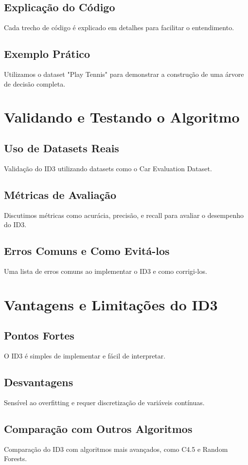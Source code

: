 \documentclass{article}
\begin{document}
\subsection{Explicação do Código}
Cada trecho de código é explicado em detalhes para facilitar o entendimento.

\subsection{Exemplo Prático}
Utilizamos o dataset "Play Tennis" para demonstrar a construção de uma árvore de decisão completa.

\section{Validando e Testando o Algoritmo}
\subsection{Uso de Datasets Reais}
Validação do ID3 utilizando datasets como o Car Evaluation Dataset.

\subsection{Métricas de Avaliação}
Discutimos métricas como acurácia, precisão, e recall para avaliar o desempenho do ID3.

\subsection{Erros Comuns e Como Evitá-los}
Uma lista de erros comuns ao implementar o ID3 e como corrigi-los.

\section{Vantagens e Limitações do ID3}
\subsection{Pontos Fortes}
O ID3 é simples de implementar e fácil de interpretar.

\subsection{Desvantagens}
Sensível ao overfitting e requer discretização de variáveis contínuas.

\subsection{Comparação com Outros Algoritmos}
Comparação do ID3 com algoritmos mais avançados, como C4.5 e Random Forests.
\end{document}
